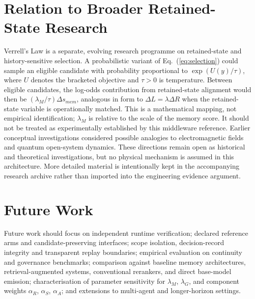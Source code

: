 \documentclass[11pt]{article}
\begin{document}
\section{Relation to Broader Retained-State Research}

Verrell's Law is a separate, evolving research programme on retained-state and history-sensitive selection. A probabilistic variant of Eq.~(\ref{eq:selection}) could sample an eligible candidate with probability proportional to $\exp(U(y)/\tau)$, where $U$ denotes the bracketed objective and $\tau>0$ is temperature. Between eligible candidates, the log-odds contribution from retained-state alignment would then be $(\lambda_M/\tau)\Delta s_{mem}$, analogous in form to $\Delta L=\lambda\Delta R$ when the retained-state variable is operationally matched. This is a mathematical mapping, not empirical identification; $\lambda_M$ is relative to the scale of the memory score. It should not be treated as experimentally established by this middleware reference. Earlier conceptual investigations considered possible analogies to electromagnetic fields and quantum open-system dynamics. These directions remain open as historical and theoretical investigations, but no physical mechanism is assumed in this architecture. More detailed material is intentionally kept in the accompanying research archive rather than imported into the engineering evidence argument.

\section{Future Work}

Future work should focus on independent runtime verification; declared reference arms and candidate-preserving interfaces; scope isolation, decision-record integrity and transparent replay boundaries; empirical evaluation on continuity and governance benchmarks; comparison against baseline memory architectures, retrieval-augmented systems, conventional rerankers, and direct base-model emission; characterisation of parameter sensitivity for $\lambda_M$, $\lambda_G$, and component weights $\alpha_R$, $\alpha_S$, $\alpha_A$; and extensions to multi-agent and longer-horizon settings.



\end{document}
